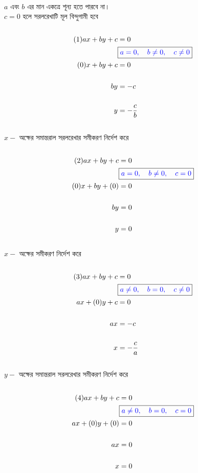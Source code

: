 \documentclass{article}
\begin{document}
\\ 
$a$ এবং  $b$ এর মান একত্রে শূন্য হতে পারবে না। 
\\
$c=0$ হলে সরলরেখাটি মূল বিন্দুগামী হবে \\
\\ 
\begin{align*}
(1)	ax+by+c&=0\\
	&\boxed{\textcolor{blue}{ a=0,\quad b\ne 0,\quad c\ne 0}}\\
	(0)x+by+c&=0\\
	\\
	by&=-c\\
	\\
	y&=-\frac{c}{b}
\end{align*}
\\
$x-$ অক্ষের সমান্তরাল সরলরেখার সমীকরণ নির্দেশ করে\\
\\ 
\begin{align*}
(2)	ax+by+c&=0\\
&\boxed{\textcolor{blue}{ a=0,\quad b\ne 0,\quad c=0}}\\
(0)x+by+(0)&=0\\
\\
by&=0\\
\\
y&=0
\end{align*}
\\
$x-$ অক্ষের সমীকরণ নির্দেশ করে\\ 
\\ 
\begin{align*}
(3)	ax+by+c&=0\\
&\boxed{\textcolor{blue}{ a\ne 0,\quad b=0,\quad c\ne 0}}\\
	ax+(0)y+c&=0\\
	\\
	ax&=-c\\
	\\
	x&=-\frac{c}{a}
\end{align*}
\\
$y-$ অক্ষের সমান্তরাল সরলরেখার সমীকরণ নির্দেশ করে\\
\\ 
\begin{align*}
(4)	ax+by+c&=0\\
&\boxed{\textcolor{blue}{a\ne 0, \quad b=0, \quad c=0}}\\
	ax+(0)y+(0)&=0\\
	\\
	ax&=0\\
	\\
	x&=0
\end{align*}
\end{document}
